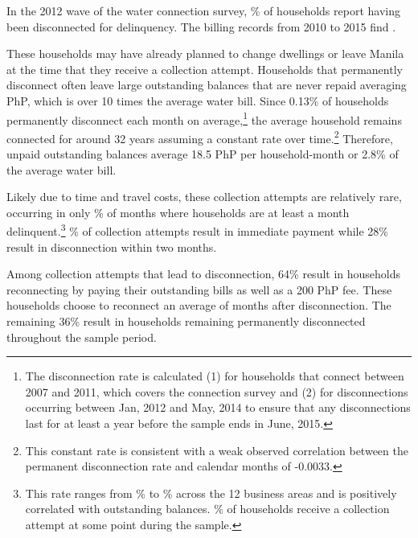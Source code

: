\documentclass[12pt]{article}
\begin{document}
In the 2012 wave of the water connection survey, \% of households report having been disconnected for delinquency.  The billing records from 2010 to 2015 find  .



These households may have already planned to change dwellings or leave Manila at the time that they receive a collection attempt.  Households that permanently disconnect often leave large outstanding balances that are never repaid averaging PhP, which is over 10 times the average water bill.  Since 0.13\% of households permanently disconnect each month on average,\footnote{The disconnection rate is calculated (1) for households that connect between 2007 and 2011, which covers the connection survey and (2) for disconnections occurring between Jan, 2012 and May, 2014 to ensure that any disconnections last for at least a year before the sample ends in June, 2015.} the average household remains connected for around 32 years assuming a constant rate over time.\footnote{This constant rate is consistent with a weak observed correlation between the permanent disconnection rate and calendar months of -0.0033.}  Therefore, unpaid outstanding balances average 18.5 PhP per household-month or 2.8\% of the average water bill.















Likely due to time and travel costs, these collection attempts are relatively rare, occurring in only \unskip\% of months where households are at least a month delinquent.\footnote{This rate ranges from \unskip\% to \unskip\% across the 12 business areas and is positively correlated with outstanding balances.  \unskip\% of households receive a collection attempt at some point during the sample.}  \unskip\% of collection attempts result in immediate payment while 28\% result in disconnection within two months.  



Among collection attempts that lead to disconnection, 64\% result in households reconnecting by paying their outstanding bills as well as a 200 PhP fee.  These households choose to reconnect an average of months after disconnection.  The remaining 36\% result in households remaining permanently disconnected throughout the sample period. 
\end{document}
